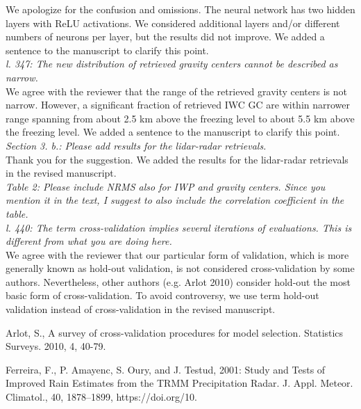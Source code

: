 \documentclass[12pt]{article}
\begin{document}
\noindent We apologize for the confusion and omissions. The neural network has two hidden layers with ReLU activations. We considered additional layers and/or different numbers of neurons per layer, but the results did not improve. We added a sentence to the manuscript to clarify this point. \\

\noindent\textit{l. 347: The new distribution of retrieved gravity centers cannot be described as narrow.}\\

\noindent We agree with the reviewer that the range of the retrieved gravity centers is not narrow. However, a significant fraction of retrieved IWC GC are within narrower range spanning from about 2.5 km above the freezing level to about 5.5 km above the freezing level. We added a sentence to the manuscript to clarify this point.\\

\noindent\textit{Section 3. b.: Please add results for the lidar-radar retrievals.}\\

\noindent Thank you for the suggestion. We added the results for the lidar-radar retrievals in the revised manuscript.\\

\noindent\textit{Table 2: Please include NRMS also for IWP and gravity centers. Since you mention it in the text, I suggest to also include the correlation coefficient in the table.}\\

\noindent\textit{l. 440: The term cross-validation implies several iterations of evaluations. This is different from what you are doing here.}\\

\noindent We agree with the reviewer that our particular form of validation, which is more generally known as hold-out validation, is not considered cross-validation by some authors. Nevertheless, other authors (e.g. Arlot 2010) consider hold-out the most basic form of cross-validation. To avoid controversy, 
we use term hold-out validation instead of cross-validation in the revised manuscript.\\






\begin{thebibliography}{999}

Arlot, S., A survey of cross-validation procedures for model selection. Statistics Surveys. 2010, 4, 40-79.


Ferreira, F., P. Amayenc, S. Oury, and J. Testud, 2001: Study and Tests of Improved Rain Estimates from the TRMM Precipitation Radar. 
J. Appl. Meteor. Climatol., 40, 1878–1899, https://doi.org/10. 

\end{thebibliography}
\end{document}
